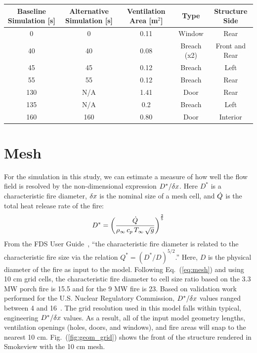 \documentclass[11pt,oneside]{book}
\begin{document}
\begin{table}
\centering
{}\label{tab:vents}
\begin{tabular}{ccccc}
\toprule[1.5pt]
Baseline Simulation [s] & Alternative Simulation [s] & Ventilation Area [m$^2$] & Type & Structure Side \\
\midrule
0    &  0   & 0.11 & Window      & Rear \\
40    &  40   & 0.08 & Breach (x2) & Front and Rear \\
45    &  45   & 0.12 & Breach      & Left \\
55    &  55   & 0.12 & Breach      & Rear \\     
130   &  N/A  & 1.41 & Door        & Rear \\
135   &  N/A  & 0.2  & Breach      & Left \\        
160   &  160  & 0.80 & Door        & Interior \\
\bottomrule[1.25pt]
\end{tabular}\par
\end{table}

\section{Mesh}
\label{mesh}

For the simulation in this study, we can estimate a measure of how well the flow field is resolved by the non-dimensional expression $D^*/\delta x$. Here $D^*$ is a characteristic fire diameter, $\delta x$ is the nominal size of a mesh cell, and $\dot{Q}$ is the total heat release rate of the fire:
\begin{equation}
D^* = \left(
     \frac{\dot{Q}}{\rho_\infty \, c_p \, T_\infty \, \sqrt{g} }
     \right)^\frac{2}{5} 
\label{eq:mesh}
\end{equation}   
From the FDS User Guide~\cite{FDS_Users_Guide}, ``the characteristic fire diameter is related to the characteristic fire size via the
relation $Q^* = (D^*/D)^{5/2}$.'' Here, $D$ is the physical diameter of the fire as input to the model. Following Eq.~(\ref{eq:mesh}) and using 10 cm grid cells, the characteristic fire diameter to cell size ratio based on the 3.3 MW porch fire is 15.5 and for the 9 MW fire is 23. Based on validation work performed for the U.S. Nuclear Regulatory Commission, $D^*/\delta x$ values ranged between 4 and 16~\cite{NUREG_1824}. The grid resolution used in this model falls within typical, engineering $D^*/\delta x$ values. As a result, all of the input model geometry lengths, ventilation openings (holes, doors, and windows), and fire areas will snap to the nearest 10 cm. Fig.~(\ref{fig:geom_grid}) shows the 
front of the structure rendered in Smokeview with the 10 cm mesh.
\end{document}
